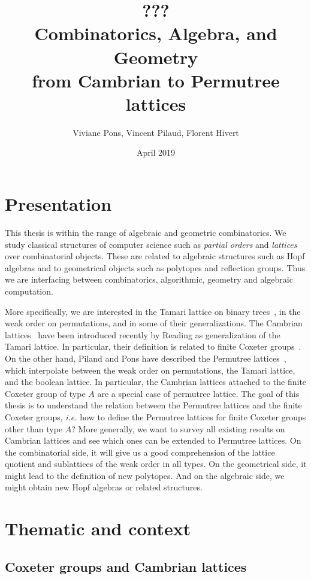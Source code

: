 \documentclass[a4paper,12pt]{article}
\title{\huge \bf ???  \\ Combinatorics, Algebra, and Geometry \\ from Cambrian to Permutree lattices}
\author{Viviane Pons, Vincent Pilaud, Florent Hivert}
\date{April 2019}
\begin{document}
\maketitle

\section{Presentation}

This thesis is within the range of algebraic and geometric combinatorics. We study classical structures of computer science such as \emph{partial orders} and \emph{lattices} over combinatorial objects. These are related to algebraic structures such as Hopf algebras and to geometrical objects such as polytopes and reflection groups. Thus we are interfacing between combinatorics, algorithmic, geometry and algebraic computation.

More specifically, we are interested in the Tamari lattice on binary trees~\cite{Tamari, HuangTamari, TamariFestschrift}, in the weak order on permutations, and in some of their generalizations. The Cambrian lattices~\cite{Reading-cambrianLattices} have been introduced recently by Reading as generalization of the Tamari lattice. In particular, their definition is related to finite Coxeter groups~\cite{Reading-FiniteCoxeterGroupsChapter}. On the other hand, Piland and Pons have described the Permutree lattices~\cite{PilaudPons-permutrees}, which interpolate between the weak order on permutations, the Tamari lattice, and the boolean lattice. In particular, the Cambrian lattices attached to the finite Coxeter group of type $A$ are a special case of permutree lattice. The goal of this thesis is to understand the relation between the Permutree lattices and the finite Coxeter groups, \emph{i.e.} how to define the Permutree lattices for finite Coxeter groups other than type $A$? More generally, we want to survey all existing results on Cambrian lattices and see which ones can be extended to Permutree lattices. On the combinatorial side, it will give us a good comprehension of the lattice quotient and sublattices of the weak order in all types. On the geometrical side, it might lead to the definition of new polytopes. And on the algebraic side, we might obtain new Hopf algebras or related structures.

\section{Thematic and context}

\subsection{Coxeter groups and Cambrian lattices}
\end{document}

